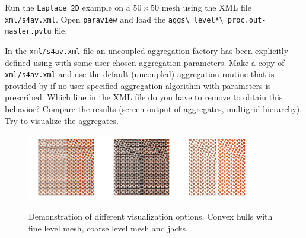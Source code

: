 \documentclass[10pt,fleqn]{book}
\begin{document}
\begin{exercise}
Run the \verb|Laplace 2D| example on a $50\times 50$ mesh using the XML file \verb|xml/s4av.xml|. Open \verb|paraview| and load the \verb|aggs\_level*\_proc.out-master.pvtu| file.
\end{exercise}
\begin{exercise}
In the \verb|xml/s4av.xml| file an uncoupled aggregation factory has been explicitly defined using with some user-chosen aggregation parameters. Make a copy of \verb|xml/s4av.xml| and use the default (uncoupled) aggregation routine that is provided by \muelu if no user-specified aggregation algorithm with parameters is prescribed. Which line in the XML file do you have to remove to obtain this behavior? Compare the results (screen output of aggregates, multigrid hierarchy). Try to visualize the aggregates.
\end{exercise}

\begin{figure}
\centering
\includegraphics[width=0.3\textwidth]{pics/s4bl1.png}\includegraphics[width=0.3\textwidth]{pics/s4bl2.png}\includegraphics[width=0.3\textwidth]{pics/s4bl3.png}
\caption{Demonstration of different visualization options. Convex hulls with fine level mesh, coarse level mesh and jacks.}
\label{fig:diffaggregatesstyles}
\end{figure}
\end{document}
